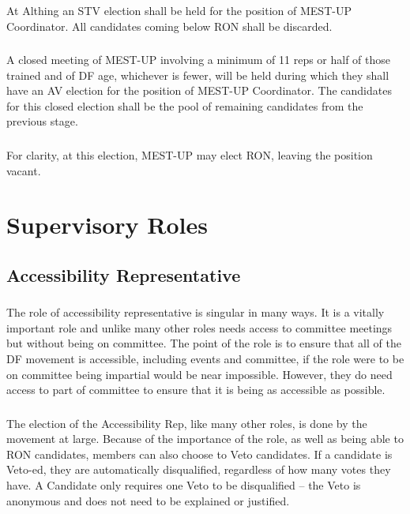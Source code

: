 \documentclass[a4paper, 11pt]{report}
\begin{document}
\subsubsection{}
At Althing an STV election shall be held for the position of MEST-UP Coordinator. All candidates coming below RON shall be discarded.

\subsubsection{}
A closed meeting of MEST-UP involving a minimum of 11 reps or half of those trained and of DF age, whichever is fewer, will be held during which they shall have an AV election for the position of MEST-UP Coordinator. The candidates for this closed election shall be the pool of remaining candidates from the previous stage.

\subsubsection{}
For clarity, at this election, MEST-UP may elect RON, leaving the position vacant.

\section{Supervisory Roles}
\subsection{Accessibility Representative}
\subsubsection{}
The role of accessibility representative is singular in many ways. It is a vitally important role and unlike many other roles needs access to committee meetings but without being on committee. The point of the role is to ensure that all of the DF movement is accessible, including events and committee, if the role were to be on committee being impartial would be near impossible. However, they do need access to part of committee to ensure that it is being as accessible as possible.
\subsubsection{}
The election of the Accessibility Rep, like many other roles, is done by the movement at large. Because of the importance of the role, as well as being able to RON candidates, members can also choose to Veto candidates. If a candidate is Veto-ed, they are automatically disqualified, regardless of how many votes they have. A Candidate only requires one Veto to be disqualified – the Veto is anonymous and does not need to be explained or justified.
\end{document}
